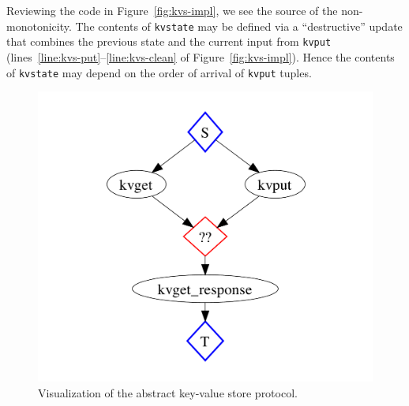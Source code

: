Reviewing the code in Figure~\ref{fig:kvs-impl}, we see the source of the
non-monotonicity.  The contents of \texttt{kvstate} may be defined via a
``destructive'' update that combines the previous state and the current input
from \texttt{kvput} (lines~\ref{line:kvs-put}--\ref{line:kvs-clean} of
Figure~\ref{fig:kvs-impl}). Hence the contents of \texttt{kvstate} may depend on
the order of arrival of \texttt{kvput} tuples.





\begin{figure}[t]
\centering
\includegraphics[width=0.8\linewidth]{fig/kvs_proto_pdg.pdf}
\vspace{-10pt}
\caption{Visualization of the abstract key-value store protocol.}
\label{fig:pdg-kvs-proto-analysis}
\vspace{-2pt}
\end{figure}


